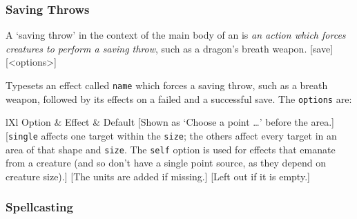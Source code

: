 		\subsubsection{Saving Throws}

			A `saving throw' in the context of the main body of an  is \textit{an action which forces creatures to perform a saving throw}, such as a dragon's breath weapon.
			[save]{[<options>]}
			{
				Typesets an effect called \texttt{name} which forces a saving throw, such as a breath weapon, followed by its effects on a failed and a successful save. The \texttt{options} are:
				\begin{RpgTable}{lXl}
					Option & Effect & Default
					[Shown as `Choose a point \ldots' before the area.]
					[\texttt{single} affects one target within the \texttt{size}; the others affect every target in an area of that shape and \texttt{size}. The \texttt{self} option is used for effects that emanate from a creature (and so don't have a single point source, as they depend on creature size).]
					[The units are added if missing.]
					[Left out if it is empty.]
				\end{RpgTable}
			}


		\subsubsection{Spellcasting}

